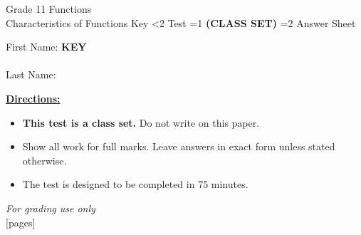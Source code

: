 \documentclass[addpoints]{exam}
\newcommand{\event}{Characteristics of Functions}
\newcommand{\tournament}{}
\def\type{0}
\begin{document}
\begin{center}
    {\huge Grade 11 Functions \\ \event
    \ifprintanswers \space Key
    \else \space \ifnum\type<2 Test \fi \ifnum\type=1 \textbf{(CLASS SET)} \fi
          \ifnum\type=2 Answer Sheet \fi
    \fi \\ \vspace{3mm}\tournament\vspace{1mm}}
\end{center}

\vspace{.25\textheight}

\begin{center}
    First Name: \ifprintanswers
    \underline{\hspace{3.5cm}}\textbf{KEY}\underline{\hspace{5.5cm}}\\\vspace{5mm}
    \else \underline{\hspace{10cm}}\\ \vspace{5mm} \fi
    Last Name: \underline{\hspace{10cm}}\\ \vspace{5mm}
\end{center}

\noindent\textbf{\underline{Directions:}}
\begin{itemize}
    \ifnum\type=1 \item \textbf{This test is a class set.} Do not write on this paper. \fi
    \item Show all work for full marks. Leave answers in exact form unless stated otherwise.
    \item The test is designed to be completed in 75 minutes.
\end{itemize}
\begin{center}
\textit{For grading use only}\\
[pages]
\end{center}
\end{document}
